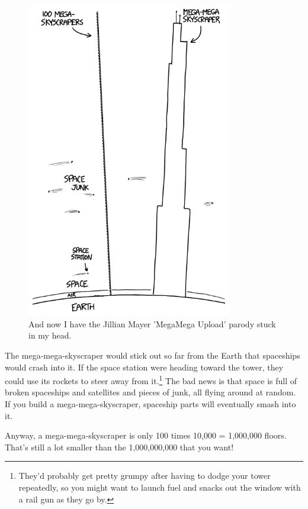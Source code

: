 {\begin{figure}[!htbp]
\centering
\includegraphics[scale=0.5, max width=0.8\textwidth]{imgs/a/94/billion_100x100x100.png}
\caption{And now I have the Jillian Mayer 'MegaMega Upload' parody stuck in my head.}
\end{figure}

{The mega-mega-skyscraper would stick out so far from the Earth that spaceships would crash into it. If the space station were heading toward the tower, they could use its rockets to steer away from it.{\footnote{They'd probably get pretty grumpy after having to dodge your tower repeatedly, so you might want to launch fuel and snacks out the window with a rail gun as they go by.} } The bad news is that space is full of broken spaceships and satellites and pieces of junk, all flying around at random. If you build a mega-mega-skyscraper, spaceship parts will eventually smash into it.}

{Anyway, a mega-mega-skyscraper is only 100 times 10,000 = 1,000,000 floors. That's still a lot smaller than the 1,000,000,000 that you want!}

}
